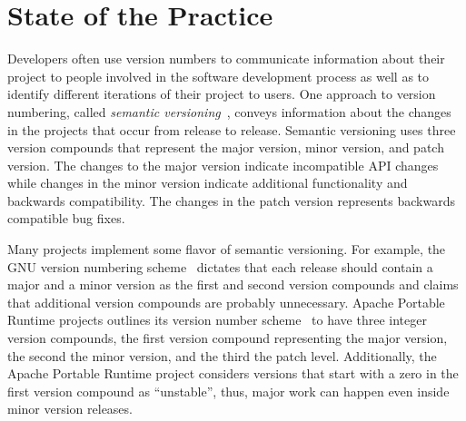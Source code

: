 \documentclass[conference]{IEEEtran}
\begin{document}


\section{State of the Practice}
\label{sec:Practice}


Developers often use version numbers to communicate information about their project to people involved in the software development process as well as to identify different iterations of their project to users.
One approach to version numbering, called \emph{semantic versioning}~\cite{SemanticVersioning}, conveys information about the changes in the projects that occur from release to release. 
Semantic versioning uses three version compounds that represent the major version, minor version, and patch version.
The changes to the major version indicate incompatible API changes while changes in the minor version indicate additional functionality and backwards compatibility.
The changes in the patch version represents backwards compatible bug fixes.


Many projects implement some flavor of semantic versioning.
For example, the GNU version numbering scheme~\cite{GNUVersionNumbering} dictates that each release should contain a major and a minor version as the first and second version compounds and claims that additional version compounds are probably unnecessary.
Apache Portable Runtime projects outlines its version number scheme~\cite{ApacheVersionNumbering} to have three integer version compounds, the first version compound representing the major version, the second the minor version, and the third the patch level.
Additionally, the Apache Portable Runtime project considers versions that start with a zero in the first version compound as ``unstable'', thus, major work can happen even inside minor version releases.
\end{document}
